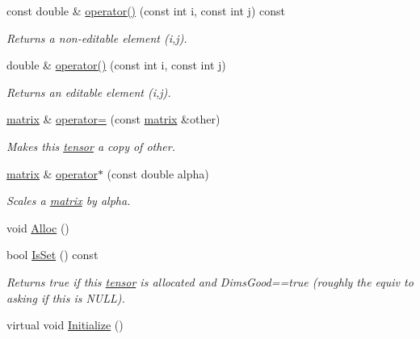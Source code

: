 \begin{DoxyCompactItemize}
const double \& \hyperlink{classJKBuilder_1_1matrix_a9ccbac42f4eefb704f04886001f4fb3e}{operator()} (const int i, const int j) const 
\begin{DoxyCompactList}\small\item\em Returns a non-\/editable element (i,j). \item\end{DoxyCompactList}\item 
double \& \hyperlink{classJKBuilder_1_1matrix_a3d7fca183ff1c9f4c160218746f2ef31}{operator()} (const int i, const int j)
\begin{DoxyCompactList}\small\item\em Returns an editable element (i,j). \item\end{DoxyCompactList}\item 
\hyperlink{classJKBuilder_1_1matrix}{matrix} \& \hyperlink{classJKBuilder_1_1matrix_a11df53cc3fc568369a9f612cfb556680}{operator=} (const \hyperlink{classJKBuilder_1_1matrix}{matrix} \&other)
\begin{DoxyCompactList}\small\item\em Makes this \hyperlink{classJKBuilder_1_1tensor}{tensor} a copy of other. \item\end{DoxyCompactList}\item 
\hyperlink{classJKBuilder_1_1matrix}{matrix} \& \hyperlink{classJKBuilder_1_1matrix_ad4799cbe4a5d07c77f41857a3ce914a2}{operator$\ast$} (const double alpha)
\begin{DoxyCompactList}\small\item\em Scales a \hyperlink{classJKBuilder_1_1matrix}{matrix} by alpha. \item\end{DoxyCompactList}\item 
void \hyperlink{classJKBuilder_1_1tensor_a0ca5cbe96d2a61f06ae4b543ef84f166}{Alloc} ()
\item 
bool \hyperlink{classJKBuilder_1_1tensor_a79c9a36acc5dbeab94033ca97971dc09}{IsSet} () const 
\begin{DoxyCompactList}\small\item\em Returns true if this \hyperlink{classJKBuilder_1_1tensor}{tensor} is allocated and DimsGood==true (roughly the equiv to asking if this is NULL). \item\end{DoxyCompactList}\item 
virtual void \hyperlink{classJKBuilder_1_1tensor_a98b1050f09da390896f964fb7a892391}{Initialize} ()

\end{DoxyCompactItemize}

